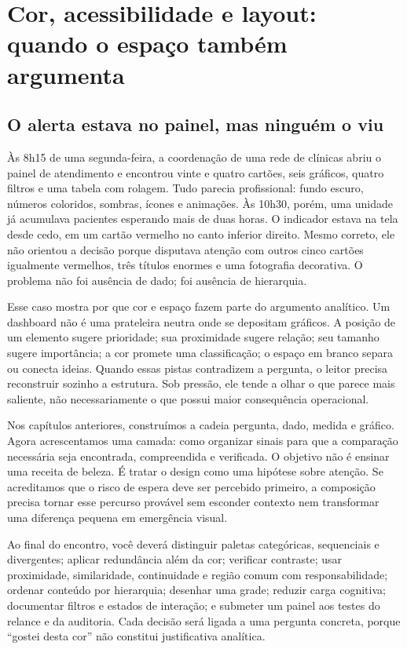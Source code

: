 \chapter[Cor, acessibilidade e layout]{Cor, acessibilidade e layout: quando o espaço também argumenta}

\section{O alerta estava no painel, mas ninguém o viu}

Às 8h15 de uma segunda-feira, a coordenação de uma rede de clínicas abriu o painel de atendimento e encontrou vinte e quatro cartões, seis gráficos, quatro filtros e uma tabela com rolagem. Tudo parecia profissional: fundo escuro, números coloridos, sombras, ícones e animações. Às 10h30, porém, uma unidade já acumulava pacientes esperando mais de duas horas. O indicador estava na tela desde cedo, em um cartão vermelho no canto inferior direito. Mesmo correto, ele não orientou a decisão porque disputava atenção com outros cinco cartões igualmente vermelhos, três títulos enormes e uma fotografia decorativa. O problema não foi ausência de dado; foi ausência de hierarquia.

Esse caso mostra por que cor e espaço fazem parte do argumento analítico. Um dashboard não é uma prateleira neutra onde se depositam gráficos. A posição de um elemento sugere prioridade; sua proximidade sugere relação; seu tamanho sugere importância; a cor promete uma classificação; o espaço em branco separa ou conecta ideias. Quando essas pistas contradizem a pergunta, o leitor precisa reconstruir sozinho a estrutura. Sob pressão, ele tende a olhar o que parece mais saliente, não necessariamente o que possui maior consequência operacional.

Nos capítulos anteriores, construímos a cadeia pergunta, dado, medida e gráfico. Agora acrescentamos uma camada: como organizar sinais para que a comparação necessária seja encontrada, compreendida e verificada. O objetivo não é ensinar uma receita de beleza. É tratar o design como uma hipótese sobre atenção. Se acreditamos que o risco de espera deve ser percebido primeiro, a composição precisa tornar esse percurso provável sem esconder contexto nem transformar uma diferença pequena em emergência visual.

Ao final do encontro, você deverá distinguir paletas categóricas, sequenciais e divergentes; aplicar redundância além da cor; verificar contraste; usar proximidade, similaridade, continuidade e região comum com responsabilidade; ordenar conteúdo por hierarquia; desenhar uma grade; reduzir carga cognitiva; documentar filtros e estados de interação; e submeter um painel aos testes do relance e da auditoria. Cada decisão será ligada a uma pergunta concreta, porque ``gostei desta cor'' não constitui justificativa analítica.

